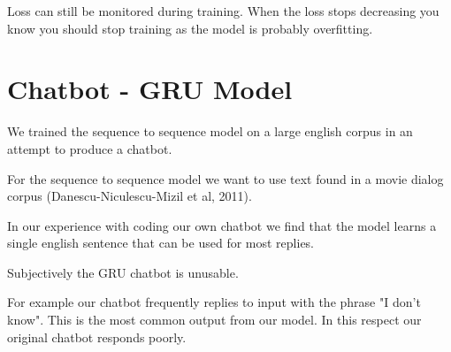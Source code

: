 Loss can still be monitored during training. When the loss stops decreasing you know you should 
stop training as the model is probably overfitting.

\section{Chatbot - GRU Model}
We trained the sequence to sequence model on a large english
corpus in an attempt to produce a chatbot. 

For the sequence to sequence model we want to use text found in a movie dialog corpus (Danescu-Niculescu-Mizil et al, 2011)\cite{Danescu-Niculescu-Mizil+Lee:11a}. 

In our experience with coding our own chatbot 
we find that the model learns a single english sentence that can be used for most replies. 

Subjectively the GRU chatbot is unusable.

For example our chatbot frequently replies to input with the phrase "I don't know". This is the most common output from our model. In this respect our original chatbot responds poorly.

